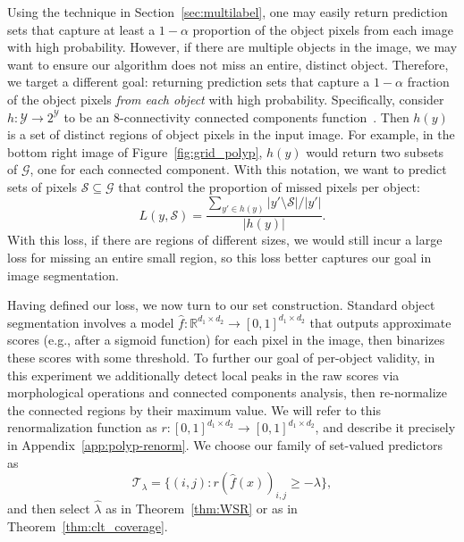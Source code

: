 \documentclass[10pt]{article}
\def\R{\mathbb{R}}
\newcommand{\Y}{\mathcal{Y}}
\newcommand{\T}{\mathcal{T}}
\newcommand{\G}{\mathcal{G}}
\renewcommand{\S}{\mathcal{S}}
\begin{document}
Using the technique in Section~\ref{sec:multilabel}, one may easily return prediction sets that capture at least a $1-\alpha$ proportion of the object pixels from each image with high probability.
However, if there are multiple objects in the image, we may want to ensure our algorithm does not miss an entire, distinct object.
Therefore, we target a different goal: returning prediction sets that capture a $1-\alpha$ fraction of the object pixels \emph{from each object} with high probability.
Specifically, consider $h: \Y \to 2^\Y$ to be an 8-connectivity connected components function~\cite{hirschberg1979computing}.
Then $h(y)$ is a set of distinct regions of object pixels in the input image. For example, in the bottom right image of Figure~\ref{fig:grid_polyp}, $h(y)$ would return two subsets of $\G$, one for each connected component. With this notation, 
we want to predict sets of pixels $\S \subseteq \G$ that control the proportion of missed pixels per object:
\begin{equation}
    \label{eq:segmentation_loss}
    L(y, \S) = \frac{\underset{y' \in h(y)}{\sum}|y' \setminus \S| / |y'|}{|h(y)|}.
\end{equation}
With this loss, if there are regions of different sizes, we would still incur a large loss for missing an entire small region, so this loss better captures our goal in image segmentation.

Having defined our loss, we now turn to our set construction.
Standard object segmentation involves a model $\hat{f} : \R^{d_1 \times d_2} \to [0,1]^{d_1 \times d_2}$ that outputs approximate scores (e.g., after a sigmoid function) for each pixel in the image, then binarizes these scores with some threshold.
To further our goal of per-object validity, in this experiment we additionally detect local peaks in the raw scores via morphological operations and connected components analysis, then re-normalize the connected regions by their maximum value. 
We will refer to this renormalization function as $r : [0,1]^{d_1 \times d_2} \to [0,1]^{d_1 \times d_2}$, and describe it precisely in Appendix~\ref{app:polyp-renorm}. We choose our family of set-valued predictors as
\begin{equation}
    \label{eq:polyp-sets}
    \T_{\lambda} = \big\{ (i,j) : r(\hat{f}(x))_{i,j} \geq -\lambda \big\},
\end{equation}
and then select $\hat{\lambda}$ as in Theorem~\ref{thm:WSR} or as in Theorem~\ref{thm:clt_coverage}.
\end{document}
